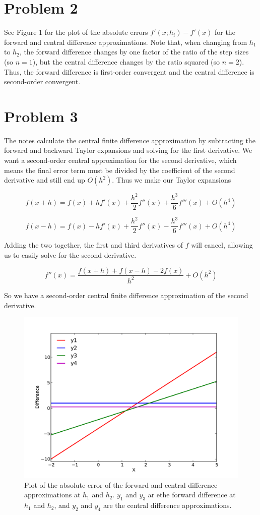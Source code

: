 \documentclass[11pt,letterpaper]{article}
\begin{document}
\section*{Problem 2}

See Figure 1 for the plot of the absolute errors $f'(x;h_i) - f'(x)$ for the forward and central difference approximations. Note that, when changing from $h_1$ to $h_2$, the forward difference changes by one factor of the ratio of the step sizes (so $n=1$), but the central difference changes by the ratio squared (so $n=2$). Thus, the forward difference is first-order convergent and the central difference is second-order convergent.

\section*{Problem 3}

The notes calculate the central finite difference approximation by subtracting the forward and backward Taylor expansions and solving for the first derivative. We want a second-order central approximation for the second derivative, which means the final error term must be divided by the coefficient of the second derivative and still end up $O(h^2)$. Thus we make our Taylor expansions

$$ f(x+h) = f(x) + h f'(x) + \frac{h^2}{2}f''(x) + \frac{h^3}{6}f'''(x) + O(h^4) $$

$$ f(x-h) = f(x) - h f'(x) + \frac{h^2}{2}f''(x) - \frac{h^3}{6}f'''(x) + O(h^4) $$

Adding the two together, the first and third derivatives of $f$ will cancel, allowing us to easily solve for the second derivative.

$$ f''(x) = \frac{f(x+h) + f(x-h) - 2f(x)}{h^2} + O(h^2) $$

So we have a second-order central finite difference approximation of the second derivative.

\begin{figure}[!htb]\centering
  \includegraphics[width=1\textwidth]{FinDifApprox}
  \caption{Plot of the absolute error of the forward and central difference approximations at $h_1$ and $h_2$. $y_1$ and $y_3$ ar ethe forward difference at $h_1$ and $h_2$, and $y_2$ and $y_4$ are the central difference approximations.}
  \end{figure}
\end{document}
